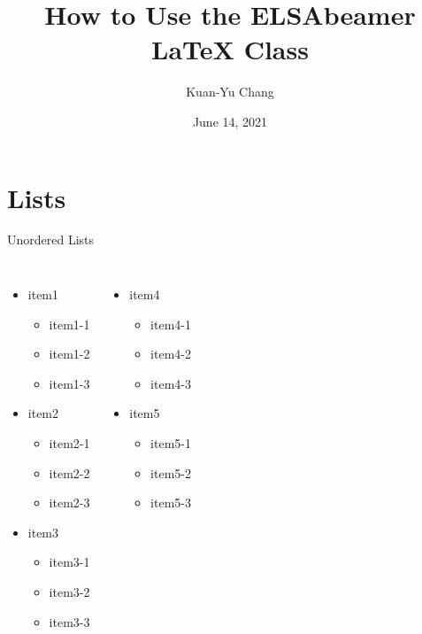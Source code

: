 \documentclass{ELSAbeamer}
\title[ELSAbeamer]{How to Use the ELSAbeamer \LaTeX{} Class}
\author[K.-Y. Chang]{Kuan-Yu Chang}
\date[2021/06/14]{June 14, 2021}
\begin{document}
\makecover

\section{Lists}

\begin{frame}{Unordered Lists}
\begin{columns}
\begin{itemize}
    \item item1
    \begin{itemize}
        \item item1-1
        \item item1-2
        \item item1-3
    \end{itemize}
    \item item2
    \begin{itemize}
        \item item2-1
        \item item2-2
        \item item2-3
    \end{itemize}
    \item item3
    \begin{itemize}
        \item item3-1
        \item item3-2
        \item item3-3
    \end{itemize}
\end{itemize}

\begin{itemize} \itemsep2em
    \item item4
    \begin{itemize} \itemsep1em
        \item item4-1
        \item item4-2
        \item item4-3
    \end{itemize}
    \item item5
    \begin{itemize} \itemsep1em
        \item item5-1
        \item item5-2
        \item item5-3
    \end{itemize}
\end{itemize}
\end{columns}
\end{frame}
\end{document}
